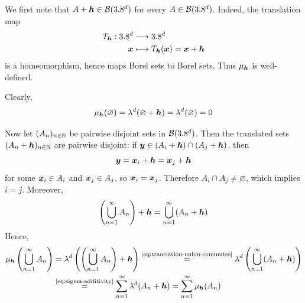 \begin{solution}
\begin{enumerate}[label={\protect\hyperref[exitem:translation-invariance-cuboids:\arabic*]{(\alph*)}}]
\item \label{solitem:translation-invariance-cuboids:3}
We first note that $A+{\boldsymbol{h}} \in \mathcal{B}(3.8^d)$ for every $A \in \mathcal{B}(3.8^d)$.
Indeed, the translation map
\[
\begin{aligned}
T_{{\boldsymbol{h}}} : 3.8^d &\longrightarrow 3.8^d \\
{\boldsymbol{x}} &\longmapsto T_{{\boldsymbol{h}}}({\boldsymbol{x}})={\boldsymbol{x}}+{\boldsymbol{h}}
\end{aligned}
\]
is a homeomorphism, hence maps Borel sets to Borel sets.
Thus $\mu_{{\boldsymbol{h}}}$ is well-defined.

Clearly,
\[
\mu_{{\boldsymbol{h}}}(\varnothing)
=
\lambda^d(\varnothing+{\boldsymbol{h}})
=
\lambda^d(\varnothing)
=
0
\]

Now let $(A_n)_{n\in\mathbb{N}}$ be pairwise disjoint sets in $\mathcal{B}(3.8^d)$.
Then the translated sets $(A_n+{\boldsymbol{h}})_{n\in\mathbb{N}}$ are pairwise disjoint:
if
\(
{\boldsymbol{y}}\in (A_i+{\boldsymbol{h}})\cap(A_j+{\boldsymbol{h}})
\), then
\[
{\boldsymbol{y}}={\boldsymbol{x}}_i+{\boldsymbol{h}}={\boldsymbol{x}}_j+{\boldsymbol{h}}
\]
for some ${\boldsymbol{x}}_i\in A_i$ and ${\boldsymbol{x}}_j\in A_j$, so ${\boldsymbol{x}}_i={\boldsymbol{x}}_j$. 
Therefore $A_i\cap A_j\neq \varnothing$, which implies $i=j$.
More\-over,
\begin{equation}\label{eq:translation-union-commutes}
\left(\bigcup_{n=1}^{\infty} A_n\right)+{\boldsymbol{h}}
=
\bigcup_{n=1}^{\infty}(A_n+{\boldsymbol{h}})
\end{equation}
Hence,
\[
\begin{aligned}
\mu_{{\boldsymbol{h}}}\left(\bigcup_{n=1}^{\infty} A_n\right)
&=
\lambda^d\left(\left(\bigcup_{n=1}^{\infty} A_n\right)+{\boldsymbol{h}}\right) 
\overset{\text{\eqref{eq:translation-union-commutes}}}{=}
\lambda^d\left(\bigcup_{n=1}^{\infty}(A_n+{\boldsymbol{h}})\right) \\
&\overset{\text{\eqref{eq:sigma-additivity}}}{=}
\sum_{n=1}^{\infty} \lambda^d(A_n+{\boldsymbol{h}})
=
\sum_{n=1}^{\infty} \mu_{{\boldsymbol{h}}}(A_n)
\end{aligned}
\]


\end{enumerate}
\end{solution}
